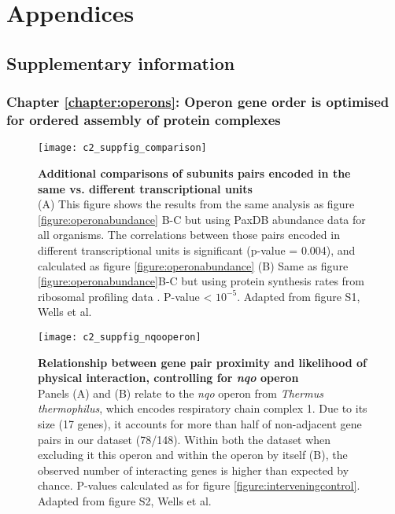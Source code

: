 \documentclass[a4paper,11pt,twoside,openright]{scrbook}
\begin{document}
\appendix \chapter{Appendices} \section{Supplementary information}

\subsection{Chapter \ref*{chapter:operons}: Operon gene order is optimised for
ordered assembly of protein complexes}

\begin{figure}[hb] \texttt{[image: c2\_suppfig\_comparison]} \caption[Additional
    comparisons of subunits pairs encoded in the same vs. different
    transcriptional units]{\sffamily \textbf{Additional comparisons of subunits
    pairs encoded in the same vs. different transcriptional units} \\ \small (A)
    This figure shows the results from the same analysis as figure
    \ref{figure:operonabundance} B-C but using PaxDB abundance data for all
    organisms. The correlations between those pairs encoded in different
    transcriptional units is significant (p-value = 0.004), and calculated as
    figure \ref{figure:operonabundance} (B) Same as figure
    \ref{figure:operonabundance}B-C but using protein synthesis rates from
    ribosomal profiling data \cite{Li2014b}. P-value < \(10^{-5}\). Adapted from
    figure S1, Wells et al. \cite{Wells2016}}
\label{suppfigure:operoncomparison} \end{figure}

\begin{figure} \texttt{[image: c2\_suppfig\_nqooperon]}
    \caption[Relationship between gene pair proximity and likelihood of physical
    interaction, controlling for \textit{nqo} operon]{\sffamily
    \textbf{Relationship between gene pair proximity and likelihood of physical
    interaction, controlling for \textit{nqo} operon} \\ \small Panels (A) and
    (B) relate to the \textit{nqo} operon from \textit{Thermus thermophilus},
    which encodes respiratory chain complex 1. Due to its size (17 genes), it
    accounts for more than half of non-adjacent gene pairs in our dataset
    (78/148). Within both the dataset when excluding it this operon and within
    the operon by itself (B), the observed number of interacting genes is higher
    than expected by chance. P-values calculated as for figure
    \ref{figure:interveningcontrol}. Adapted from figure S2, Wells et al.
    \cite{Wells2016}} \label{suppfigure:nqooperon} \end{figure}
\end{document}
